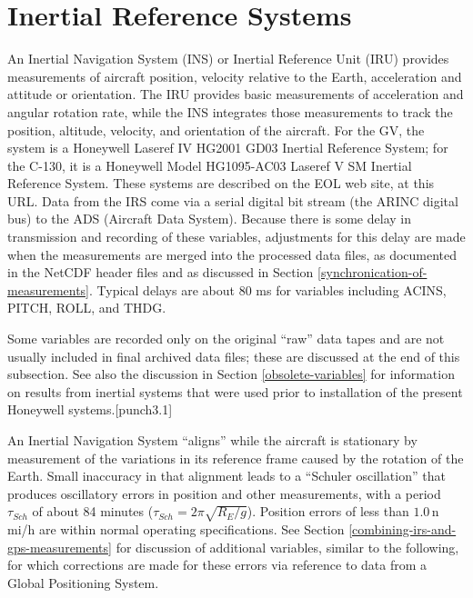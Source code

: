 \documentclass[
  english,
]{book}
\begin{document}
\hypertarget{inertial-reference-systems}{%
\section{Inertial Reference Systems}\label{inertial-reference-systems}}

An Inertial Navigation System (INS) or Inertial Reference Unit (IRU) provides measurements of aircraft position, velocity relative to the Earth, acceleration and attitude or orientation. The IRU provides basic measurements of acceleration and angular rotation rate, while the INS integrates those measurements to track the position, altitude, velocity, and orientation of the aircraft. For the GV, the system is a Honeywell Laseref IV HG2001 GD03 Inertial Reference System; for the C-130, it is a Honeywell Model HG1095-AC03 Laseref V SM Inertial Reference System. These systems are described on the EOL web site, at this URL. Data from the IRS come via a serial digital bit stream (the ARINC digital bus) to the ADS (Aircraft Data System). Because there is some delay in transmission and recording of these variables, adjustments for this delay are made when the measurements are merged into the processed data files, as documented in the NetCDF header files and as discussed in Section \ref{synchronication-of-measurements}. Typical delays are about 80 ms for variables including ACINS, PITCH, ROLL, and THDG.

Some variables are recorded only on the original ``raw'' data tapes and are not usually included in final archived data files; these are discussed at the end of this subsection. See also the discussion in Section \ref{obsolete-variables} for information on results from inertial systems that were used prior to installation of the present Honeywell systems.\protect\hypertarget{punch3.1}{}{{[}punch3.1{]}}

An Inertial Navigation System ``aligns'' while the aircraft is stationary by measurement of the variations in its reference frame caused by the rotation of the Earth. Small inaccuracy in that alignment leads to a ``Schuler oscillation'' that produces oscillatory errors in position and other measurements, with a period \(\tau_{Sch}\) of about 84 minutes (\(\tau_{Sch}=2\pi\sqrt{R_{E}/g}\)). Position errors of less than \(1.0\,\)n mi/h are within normal operating specifications. See Section \ref{combining-irs-and-gps-measurements} for discussion of additional variables, similar to the following, for which corrections are made for these errors via reference to data from a Global Positioning System.
\end{document}

